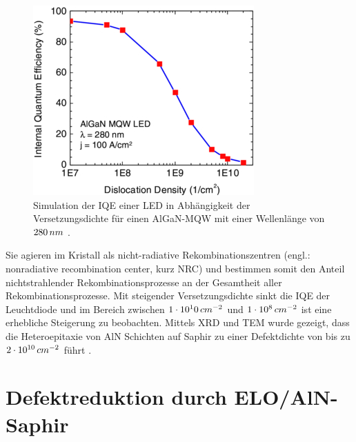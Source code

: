 %
\begin{figure}[h]
\centering
\begin{minipage}[t]{1\linewidth}
\centering
\includegraphics[width=0.5\linewidth]{Bilder/IQEthreadingdisl.png}
\end{minipage}%
\caption{Simulation der IQE einer LED in Abhängigkeit der Versetzungsdichte für einen AlGaN-MQW mit einer Wellenlänge von $280 \thinspace nm$ \cite{0268-1242-26-1-014036}.}
 \label{fig:IQEthreadingdisl}
\end{figure}
\noindent
%
Sie agieren im Kristall als nicht-radiative Rekombinationszentren (engl.: nonradiative recombination center, kurz NRC) und bestimmen somit den Anteil nichtstrahlender Rekombinationsprozesse an der Gesamtheit aller Rekombinationsprozesse. Mit steigender Versetzungsdichte sinkt die IQE der Leuchtdiode und im Bereich zwischen $1\cdot 10^10 \thinspace cm^{-2}$ und $1\cdot 10^8 \thinspace cm^{-2}$ ist eine erhebliche Steigerung zu beobachten. Mittels XRD und TEM wurde gezeigt, dass die Heteroepitaxie von AlN Schichten auf Saphir zu einer Defektdichte von bis zu $2\cdot 10^{10} \thinspace cm^{-2}$ führt \cite{zeimeru}.

\section{Defektreduktion durch ELO/AlN-Saphir}

